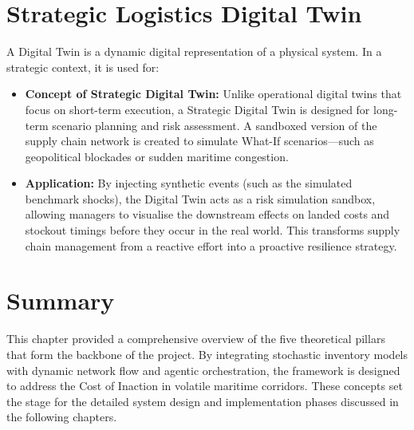 \section{Strategic Logistics Digital Twin}
A Digital Twin is a dynamic digital representation of a physical system. In a strategic context, it is used for:

\begin{itemize}
    \item \textbf{Concept of Strategic Digital Twin:} Unlike operational digital twins that focus on short-term execution, a Strategic Digital Twin is designed for long-term scenario planning and risk assessment. A sandboxed version of the supply chain network is created to simulate What-If scenarios---such as geopolitical blockades or sudden maritime congestion.
    \item \textbf{Application:} By injecting synthetic events (such as the simulated benchmark shocks), the Digital Twin acts as a risk simulation sandbox, allowing managers to visualise the downstream effects on landed costs and stockout timings before they occur in the real world. This transforms supply chain management from a reactive effort into a proactive resilience strategy.
\end{itemize}

\vspace{0.75cm}

\section{Summary}
This chapter provided a comprehensive overview of the five theoretical pillars that form the backbone of the project. By integrating stochastic inventory models with dynamic network flow and agentic orchestration, the framework is designed to address the Cost of Inaction in volatile maritime corridors. These concepts set the stage for the detailed system design and implementation phases discussed in the following chapters.
